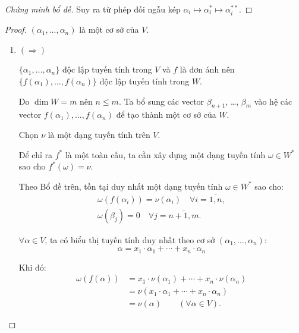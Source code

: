 \begin{proof}[Chứng minh bổ đề]
    Suy ra từ phép đối ngẫu kép $\alpha_{i} \mapsto {\alpha}^{*}_{i} \mapsto {\alpha}^{**}_{i}$.
\end{proof}

\begin{proof}
    $(\alpha_{1}, \ldots, \alpha_{n})$ là một cơ sở của $V$.
    \begin{enumerate}[label = (\arabic*)]
        \item $(\Rightarrow)$
              
              $\{\alpha_{1}, \ldots, \alpha_{n}\}$ độc lập tuyến tính trong $V$ và $f$ là đơn ánh nên $\{f(\alpha_{1}), \ldots, f(\alpha_{n})\}$ độc lập tuyến tính trong $W$.
              
              Do $\dim W = m$ nên $n\le m$. Ta bổ sung các vector $\beta_{n+1}$, \ldots, $\beta_{m}$ vào hệ các vector $f(\alpha_{1}), \ldots, f(\alpha_{n})$ để tạo thành một cơ sở của $W$.
              
              Chọn $\nu$ là một dạng tuyến tính trên $V$.
              
              Để chỉ ra $f^{*}$ là một toàn cấu, ta cần xây dựng một dạng tuyến tính $\omega\in W^{*}$ sao cho $f^{*}(\omega) = \nu$.
              
              Theo Bổ đề trên, tồn tại duy nhất một dạng tuyến tính $\omega\in W^{*}$ sao cho:
              \[
                  \begin{split}
                      \omega(f(\alpha_{i})) = \nu(\alpha_{i})\quad\forall i = \overline{1, n}, \\
                      \omega(\beta_{j}) = 0 \quad\forall j = \overline{n+1, m}.
                  \end{split}
              \]
              
              $\forall \alpha\in V$, ta có biểu thị tuyến tính duy nhất theo cơ sở $(\alpha_{1}, \ldots, \alpha_{n})$:
              \[
                  \alpha = x_{1}\cdot\alpha_{1} + \cdots + x_{n}\cdot\alpha_{n}
              \]
              
              Khi đó:
              \begin{align*}
                  \omega(f(\alpha)) & = x_{1}\cdot\nu(\alpha_{1}) + \cdots + x_{n}\cdot\nu(\alpha_{n}) \\
                                    & = \nu(x_{1}\cdot\alpha_{1} + \cdots + x_{n}\cdot\alpha_{n})      \\
                                    & = \nu(\alpha)\qquad (\forall\alpha\in V).
              \end{align*}
              

\end{enumerate}
\end{proof}

